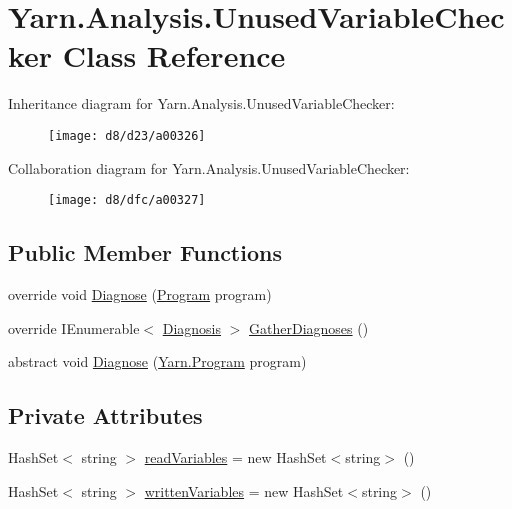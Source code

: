 \hypertarget{a00084}{\section{Yarn.\-Analysis.\-Unused\-Variable\-Checker Class Reference}
\label{a00084}
}


Inheritance diagram for Yarn.\-Analysis.\-Unused\-Variable\-Checker\-:
\nopagebreak
\begin{figure}[H]
\begin{center}
\leavevmode
\texttt{[image: d8/d23/a00326]}
\end{center}
\end{figure}


Collaboration diagram for Yarn.\-Analysis.\-Unused\-Variable\-Checker\-:
\nopagebreak
\begin{figure}[H]
\begin{center}
\leavevmode
\texttt{[image: d8/dfc/a00327]}
\end{center}
\end{figure}
\subsection*{Public Member Functions}
\begin{DoxyCompactItemize}
\item 
override void \hyperlink{a00084_aeac8f333d4dcc85f4d4a716bf8fea01f}{Diagnose} (\hyperlink{a00067}{Program} program)
\item 
override I\-Enumerable$<$ \hyperlink{a00035}{Diagnosis} $>$ \hyperlink{a00084_a107aecf707b130c4b733930a95f9154e}{Gather\-Diagnoses} ()
\item 
abstract void \hyperlink{a00028_aba4a36cb823b11ee491074e26477d084}{Diagnose} (\hyperlink{a00067}{Yarn.\-Program} program)
\end{DoxyCompactItemize}
\subsection*{Private Attributes}
\begin{DoxyCompactItemize}
\item 
Hash\-Set$<$ string $>$ \hyperlink{a00084_a6b542092ddce1b92c9455d60899518a9}{read\-Variables} = new Hash\-Set$<$string$>$ ()
\item 
Hash\-Set$<$ string $>$ \hyperlink{a00084_a0c2fe6eded1b10b135ca2469f5980a39}{written\-Variables} = new Hash\-Set$<$string$>$ ()
\end{DoxyCompactItemize}


